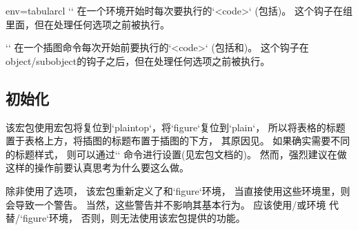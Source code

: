 \begin{tableobject}{env=tabular}{cl}
\DescribeMacro{\AtBeginSubobject}
``
  在一个环境开始时每次要执行的`<code>`
  (包括)。
  这个钩子在组里面，但在处理任何选项之前被执行。

\DescribeMacro{\AtBeginGraphicObject}
``
  在一个插图命令每次开始前要执行的`<code>`
  (包括和)。
  这个钩子在object\slash{}subobject的钩子之后，但在处理任何选项之前被执行。


\subsection{初始化}
\label{initialization}

该宏包使用宏包将复位到`plaintop`，将`figure`复位到`plain`，
所以将表格的标题置于表格上方，将插图的标题布置于插图的下方，
其原因见\autocite{texexchange_caption_position}。
如果确实需要不同的标题样式，
则可以通过`\restylefloat` 命令进行设置(见宏包文档的\autocite{float})。
然而，强烈建议在做这样的操作前要认真思考为什么要这么做。

除非使用了选项，
该宏包重新定义了和`figure`环境，
当直接使用这些环境里，则会导致一个警告。
当然，这些警告并不影响其基本行为。
应该使用\slash {}或环境
代替\slash `figure`环境，
否则，则无法使用该宏包提供的功能。


\end{tableobject}
